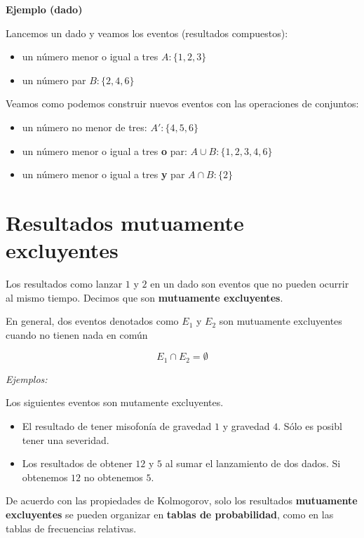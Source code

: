 \documentclass[
]{book}
\providecommand{\tightlist}{%
  \setlength{\itemsep}{0pt}\setlength{\parskip}{0pt}}
\begin{document}
\textbf{Ejemplo (dado)}

Lancemos un dado y veamos los eventos (resultados compuestos):

\begin{itemize}
\tightlist
\item
  un número menor o igual a tres \(A:\{1,2,3\}\)
\item
  un número par \(B:\{2,4,6\}\)
\end{itemize}

Veamos como podemos construir nuevos eventos con las operaciones de conjuntos:

\begin{itemize}
\tightlist
\item
  un número no menor de tres: \(A':\{4,5,6\}\)
\item
  un número menor o igual a tres \textbf{o} par: \(A \cup B: \{1,2,3,4,6\}\)
\item
  un número menor o igual a tres \textbf{y} par \(A \cap B: \{2\}\)
\end{itemize}

\hypertarget{resultados-mutuamente-excluyentes}{%
\section{Resultados mutuamente excluyentes}\label{resultados-mutuamente-excluyentes}}

Los resultados como lanzar \(1\) y \(2\) en un dado son eventos que no pueden ocurrir al mismo tiempo. Decimos que son \textbf{mutuamente excluyentes}.

En general, dos eventos denotados como \(E_1\) y \(E_2\) son mutuamente excluyentes cuando no tienen nada en común

\[E_1\cap E_2=\emptyset\]

\emph{Ejemplos:}

Los siguientes eventos son mutamente excluyentes.

\begin{itemize}
\item
  El resultado de tener misofonía de gravedad \(1\) y gravedad \(4\). Sólo es posibl tener una severidad.
\item
  Los resultados de obtener \(12\) y \(5\) al sumar el lanzamiento de dos dados. Si obtenemos \(12\) no obtenemos \(5\).
\end{itemize}

De acuerdo con las propiedades de Kolmogorov, solo los resultados \textbf{mutuamente excluyentes} se pueden organizar en \textbf{tablas de probabilidad}, como en las tablas de frecuencias relativas.
\end{document}
